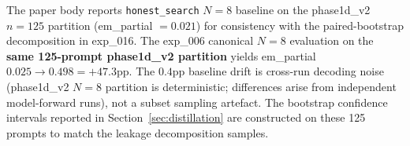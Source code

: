The paper body reports \texttt{honest\_search} $N{=}8$ baseline on the phase1d\_v2 $n{=}125$ partition (em\_partial $=0.021$) for consistency with the paired-bootstrap decomposition in exp\_016. The exp\_006 canonical $N{=}8$ evaluation on the \textbf{same 125-prompt phase1d\_v2 partition} yields em\_partial $0.025 \to 0.498 = +47.3$pp. The $0.4$pp baseline drift is cross-run decoding noise (phase1d\_v2 $N{=}8$ partition is deterministic; differences arise from independent model-forward runs), not a subset sampling artefact. The bootstrap confidence intervals reported in Section~\ref{sec:distillation} are constructed on these 125 prompts to match the leakage decomposition samples.
